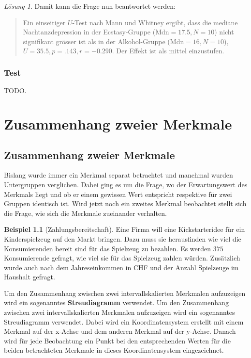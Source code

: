 \documentclass[
]{book}
\theoremstyle{definition}
\theoremstyle{definition}
\newtheorem{example}{Beispiel}[chapter]
\theoremstyle{definition}
\theoremstyle{definition}
\theoremstyle{remark}
\newtheorem*{solution}{Lösung}
\begin{document}
\begin{solution}
Damit kann die Frage nun beantwortet werden:

\begin{quote}
Ein einseitiger \(U\)-Test nach Mann und Whitney ergibt, dass die mediane Nachtanzdepression in der Ecstasy-Gruppe (\(\text{Mdn}=17.5, N = 10\)) nicht signifikant grösser ist als in der Alkohol-Gruppe (\(\text{Mdn}= 16, N =10\)), \(U = 35.5, p = .143, r = -0.290\). Der Effekt ist als mittel einzustufen.
\end{quote}

\end{solution}

\section{Test}\label{test-3}

TODO.

\part{Zusammenhang zweier Merkmale}\label{part-zusammenhang-zweier-merkmale}

\chapter{Zusammenhang zweier Merkmale}\label{zusammenhang-zweier-merkmale}

Bislang wurde immer ein Merkmal separat betrachtet und manchmal wurden Untergruppen verglichen. Dabei ging es um die Frage, wo der Erwartungswert des Merkmals liegt und ob er einem gewissen Wert entspricht respektive für zwei Gruppen identisch ist. Wird jetzt noch ein zweites Merkmal beobachtet stellt sich die Frage, wie sich die Merkmale zueinander verhalten.

\begin{example}[Zahlungsbereitschaft]
\protect\hypertarget{exm:zahlungsbereitschaft}{}\label{exm:zahlungsbereitschaft}Eine Firma will eine Kickstarteridee für ein Kinderspielzeug auf den Markt bringen. Dazu muss sie herausfinden wie viel die Konsumierenden bereit sind für das Spielzeug zu bezahlen. Es werden \(375\) Konsumierende gefragt, wie viel sie für das Spielzeug zahlen würden. Zusätzlich wurde auch nach dem Jahreseinkommen in CHF und der Anzahl Spielzeuge im Haushalt gefragt.
\end{example}

\label{customdef-streudiagramm}{Um den Zusammenhang zwischen zwei intervallskalierten Merkmalen aufzuzeigen wird ein sogenanntes \textbf{Streudiagramm} verwendet.}
Um den Zusammenhang zwischen zwei intervallskalierten Merkmalen aufzuzeigen wird ein sogenanntes Streudiagramm verwendet. Dabei wird ein Koordinatensystem erstellt mit einem Merkmal auf der x-Achse und dem anderen Merkmal auf der y-Achse. Danach wird für jede Beobachtung ein Punkt bei den entsprechenden Werten für die beiden betrachteten Merkmale in dieses Koordinatensystem eingezeichnet.
\end{document}
